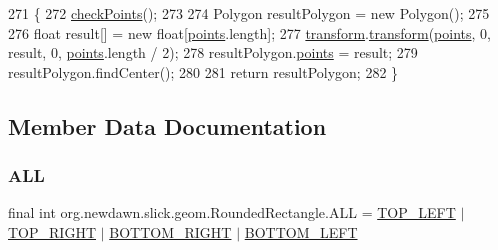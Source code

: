 \begin{DoxyCode}
271                                                 \{
272         \mbox{\hyperlink{classorg_1_1newdawn_1_1slick_1_1geom_1_1_shape_a84293802d05e8666a441720bfc12745d}{checkPoints}}();
273         
274         Polygon resultPolygon = \textcolor{keyword}{new} Polygon();
275         
276         \textcolor{keywordtype}{float} result[] = \textcolor{keyword}{new} \textcolor{keywordtype}{float}[\mbox{\hyperlink{classorg_1_1newdawn_1_1slick_1_1geom_1_1_shape_a8b4d4058734bbb3b96072e470b92aa37}{points}}.length];
277         \mbox{\hyperlink{classorg_1_1newdawn_1_1slick_1_1geom_1_1_rounded_rectangle_a555336c3e44a0c74cd466ee01ec163cc}{transform}}.\mbox{\hyperlink{classorg_1_1newdawn_1_1slick_1_1geom_1_1_shape_a463826a085479c379e40f012e970b997}{transform}}(\mbox{\hyperlink{classorg_1_1newdawn_1_1slick_1_1geom_1_1_shape_a8b4d4058734bbb3b96072e470b92aa37}{points}}, 0, result, 0, \mbox{\hyperlink{classorg_1_1newdawn_1_1slick_1_1geom_1_1_shape_a8b4d4058734bbb3b96072e470b92aa37}{points}}.length / 2);
278         resultPolygon.\mbox{\hyperlink{classorg_1_1newdawn_1_1slick_1_1geom_1_1_shape_a8b4d4058734bbb3b96072e470b92aa37}{points}} = result;
279         resultPolygon.findCenter();
280 
281         \textcolor{keywordflow}{return} resultPolygon;
282     \}
\end{DoxyCode}


\subsection{Member Data Documentation}
\mbox{\label{classorg_1_1newdawn_1_1slick_1_1geom_1_1_rounded_rectangle_a5f7a27b3a8d4b4b9c2ea8776674a0fd8}} 
\subsubsection{\texorpdfstring{A\+LL}{ALL}}
{\footnotesize\ttfamily final int org.\+newdawn.\+slick.\+geom.\+Rounded\+Rectangle.\+A\+LL = \mbox{\hyperlink{classorg_1_1newdawn_1_1slick_1_1geom_1_1_rounded_rectangle_aaaa1eab1fd4a8d956245dd981ce1dfab}{T\+O\+P\+\_\+\+L\+E\+FT}} $\vert$ \mbox{\hyperlink{classorg_1_1newdawn_1_1slick_1_1geom_1_1_rounded_rectangle_a03e561bba16398be265f6949561f05bd}{T\+O\+P\+\_\+\+R\+I\+G\+HT}} $\vert$ \mbox{\hyperlink{classorg_1_1newdawn_1_1slick_1_1geom_1_1_rounded_rectangle_a747856ebcd2fa8d0b68c3506a666da20}{B\+O\+T\+T\+O\+M\+\_\+\+R\+I\+G\+HT}} $\vert$ \mbox{\hyperlink{classorg_1_1newdawn_1_1slick_1_1geom_1_1_rounded_rectangle_af5715c13c3b07283282396746796ec1c}{B\+O\+T\+T\+O\+M\+\_\+\+L\+E\+FT}}\hspace{0.3cm}{\ttfamily [static]}}

